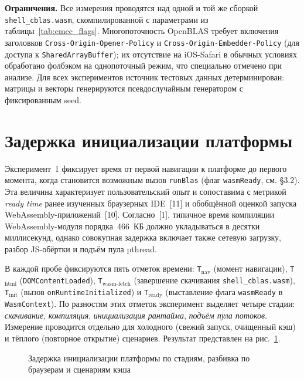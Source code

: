 \documentclass[12pt, oneside]{book}
\begin{document}
    \quad \textbf{Ограничения.} Все измерения проводятся над одной и той же сборкой \texttt{shell\_cblas.wasm}, скомпилированной с параметрами из таблицы~\ref{tab:emcc_flags}. Многопоточность OpenBLAS требует включения заголовков \texttt{Cross-Origin-Opener-Policy} и \texttt{Cross-Origin-Embedder-Policy} (для доступа к \texttt{SharedArrayBuffer}); их отсутствие на iOS-Safari в обычных условиях обработано фолбэком на однопоточный режим, что специально отмечено при анализе. Для всех экспериментов источник тестовых данных детерминирован: матрицы и векторы генерируются псевдослучайным генератором с фиксированным seed.

\section{Задержка инициализации платформы}
\label{sec:exp_coldload}

    \quad Эксперимент~1 фиксирует время от первой навигации к платформе до первого момента, когда становится возможным вызов \texttt{runBlas} (флаг \texttt{wasmReady}, см. §3.2). Эта величина характеризует пользовательский опыт и сопоставима с метрикой \emph{ready time} ранее изученных браузерных IDE~[11] и обобщённой оценкой запуска WebAssembly-приложений~[10]. Согласно~[1], типичное время компиляции WebAssembly-модуля порядка~466~КБ должно укладываться в десятки миллисекунд, однако совокупная задержка включает также сетевую загрузку, разбор JS-обёртки и подъём пула pthread.

    \quad В каждой пробе фиксируются пять отметок времени: \texttt{T}$_\text{nav}$ (момент навигации), \texttt{T}$_\text{html}$ (\texttt{DOMContent\-Loaded}), \texttt{T}$_\text{wasm-fetch}$ (завершение скачивания \texttt{shell\_cblas.wasm}), \texttt{T}$_\text{init}$ (вызов \texttt{onRuntime\-Initialized}) и \texttt{T}$_\text{ready}$ (выставление флага \texttt{wasmReady} в \texttt{WasmContext}). По разностям этих отметок эксперимент выделяет четыре стадии: \emph{скачивание}, \emph{компиляция}, \emph{инициализация рантайма}, \emph{подъём пула потоков}. Измерение проводится отдельно для холодного (свежий запуск, очищенный кэш) и тёплого (повторное открытие) сценариев. Результат представлен на рис.~\ref{fig:exp_coldload}.

\begin{figure}[htbp]
\centering
{}
\caption{Задержка инициализации платформы по стадиям, разбивка по браузерам и сценариям кэша}
\label{fig:exp_coldload}
\end{figure}
\end{document}
